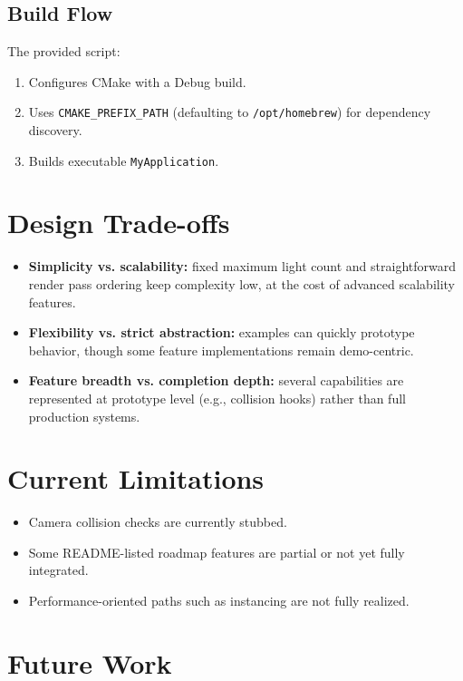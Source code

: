 \documentclass[11pt]{article}
\begin{document}
\subsection{Build Flow}

The provided script:
\begin{enumerate}[leftmargin=*]
  \item Configures CMake with a Debug build.
  \item Uses \texttt{CMAKE\_PREFIX\_PATH} (defaulting to \texttt{/opt/homebrew}) for dependency discovery.
  \item Builds executable \texttt{MyApplication}.
\end{enumerate}

\section{Design Trade-offs}

\begin{itemize}[leftmargin=*]
  \item \textbf{Simplicity vs. scalability:} fixed maximum light count and straightforward render pass ordering keep complexity low, at the cost of advanced scalability features.
  \item \textbf{Flexibility vs. strict abstraction:} examples can quickly prototype behavior, though some feature implementations remain demo-centric.
  \item \textbf{Feature breadth vs. completion depth:} several capabilities are represented at prototype level (e.g., collision hooks) rather than full production systems.
\end{itemize}

\section{Current Limitations}

\begin{itemize}[leftmargin=*]
  \item Camera collision checks are currently stubbed.
  \item Some README-listed roadmap features are partial or not yet fully integrated.
  \item Performance-oriented paths such as instancing are not fully realized.
\end{itemize}

\section{Future Work}
\end{document}
